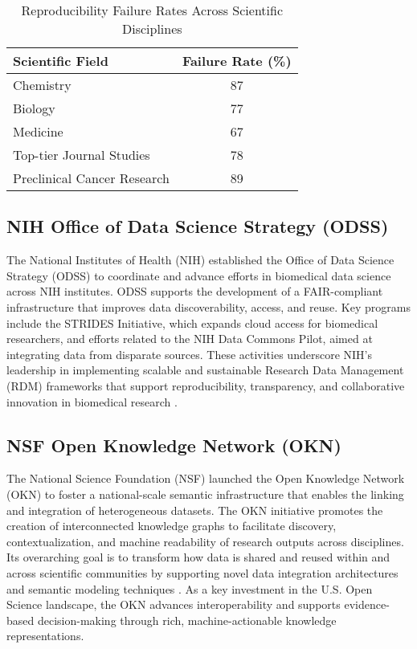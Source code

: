 \begin{table}[h]
    \centering
    \caption{Reproducibility Failure Rates Across Scientific Disciplines}
    \begin{tabular}{|l|c|}
        \hline
        \textbf{Scientific Field}   & \textbf{Failure Rate (\%)} \\
        \hline
        Chemistry                   & 87                         \\
        Biology                     & 77                         \\
        Medicine                    & 67                         \\
        Top-tier Journal Studies    & 78                         \\
        Preclinical Cancer Research & 89                         \\
        \hline
    \end{tabular}
    \label{tab:reproducibility}
\end{table}








\subsection{NIH Office of Data Science Strategy (ODSS)}

The National Institutes of Health (NIH) established the Office of Data Science Strategy (ODSS) to coordinate and advance efforts in biomedical data science across NIH institutes. ODSS supports the development of a FAIR-compliant infrastructure that improves data discoverability, access, and reuse. Key programs include the STRIDES Initiative, which expands cloud access for biomedical researchers, and efforts related to the NIH Data Commons Pilot, aimed at integrating data from disparate sources. These activities underscore NIH’s leadership in implementing scalable and sustainable Research Data Management (RDM) frameworks that support reproducibility, transparency, and collaborative innovation in biomedical research \cite{odss_nih}.

\subsection{NSF Open Knowledge Network (OKN)}

The National Science Foundation (NSF) launched the Open Knowledge Network (OKN) to foster a national-scale semantic infrastructure that enables the linking and integration of heterogeneous datasets. The OKN initiative promotes the creation of interconnected knowledge graphs to facilitate discovery, contextualization, and machine readability of research outputs across disciplines. Its overarching goal is to transform how data is shared and reused within and across scientific communities by supporting novel data integration architectures and semantic modeling techniques \cite{nsf_okn}. As a key investment in the U.S. Open Science landscape, the OKN advances interoperability and supports evidence-based decision-making through rich, machine-actionable knowledge representations.

